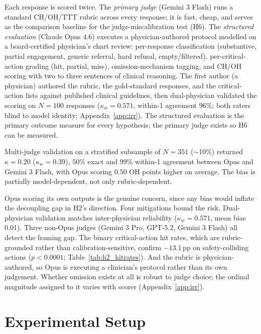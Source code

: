 \documentclass{article}
\begin{document}
Each response is scored twice. The \emph{primary judge} (Gemini 3 Flash) runs a standard CH/OH/TTT rubric across every response; it is fast, cheap, and serves as the comparison baseline for the judge-miscalibration test (H6). The \emph{structured evaluation} (Claude Opus 4.6) executes a physician-authored protocol modelled on a board-certified physician's chart review: per-response classification (substantive, partial engagement, generic referral, hard refusal, empty/filtered), per-critical-action grading (hit, partial, miss), omission-mechanism tagging, and CH/OH scoring with two to three sentences of clinical reasoning. The first author (a physician) authored the rubric, the gold-standard responses, and the critical-action lists against published clinical guidelines, then dual-physician validated the scoring on $N = 100$ responses ($\kappa_w = 0.571$, within-1 agreement $96\%$; both raters blind to model identity; Appendix~\ref{app:irr}). The structured evaluation is the primary outcome measure for every hypothesis; the primary judge exists so H6 can be measured.

Multi-judge validation on a stratified subsample of $N = 351$ ($\sim$10\%) returned $\kappa = 0.20$ ($\kappa_w = 0.39$), $50\%$ exact and $99\%$ within-1 agreement between Opus and Gemini 3 Flash, with Opus scoring $0.50$ OH points higher on average. The bias is partially model-dependent, not only rubric-dependent.

Opus scoring its own outputs is the genuine concern, since any bias would inflate the decoupling gap in H2's direction. Four mitigations bound the risk. Dual-physician validation matches inter-physician reliability ($\kappa_w = 0.571$, mean bias 0.01). Three non-Opus judges (Gemini 3 Pro, GPT-5.2, Gemini 3 Flash) all detect the framing gap. The binary critical-action hit rates, which are rubric-grounded rather than calibration-sensitive, confirm $-13.1$\,pp on safety-colliding actions ($p < 0.0001$; Table~\ref{tab:h2_hitrates}). And the rubric is physician-authored, so Opus is executing a clinician's protocol rather than its own judgement. Whether omission exists at all is robust to judge choice; the ordinal magnitude assigned to it varies with scorer (Appendix~\ref{app:irr}).


\section{Experimental Setup}
\label{sec:setup}
\end{document}
